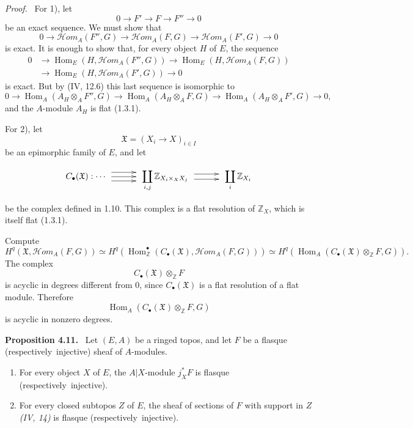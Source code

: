 \documentclass[11pt]{article}
\newcommand{\ZZ}{\mathbb Z}
\newcommand{\Hom}{\operatorname{Hom}}
\newcommand{\resp}{respectively}
\newcommand{\Hhom}{\mathcal{H}om}
\newenvironment{statement}[1]{\par\medskip\noindent\textbf{#1.}\ }{\par\medskip}
\newenvironment{prooftext}{\par\noindent\emph{Proof.}\ }{\par\medskip}
\begin{document}
\begin{prooftext}
For 1), let
\[
0\longrightarrow F'\longrightarrow F\longrightarrow F''\longrightarrow0
\]
be an exact sequence. We must show that
\[
0\longrightarrow \Hhom_A(F'',G)\longrightarrow \Hhom_A(F,G)
\longrightarrow \Hhom_A(F',G)\longrightarrow0
\]
is exact. It is enough to show that, for every object $H$ of $E$, the sequence
\begin{align*}
0&\longrightarrow \Hom_E(H,\Hhom_A(F'',G))
\longrightarrow \Hom_E(H,\Hhom_A(F,G))\\
&\longrightarrow \Hom_E(H,\Hhom_A(F',G))\longrightarrow0
\end{align*}
is exact. But by (IV, 12.6) this last sequence is isomorphic to
\[
0\to \Hom_A(A_H\otimes_A F'',G)
\to \Hom_A(A_H\otimes_A F,G)
\to \Hom_A(A_H\otimes_A F',G)\to0,
\]
and the $A$-module $A_H$ is flat (1.3.1).

For 2), let
\[
\mathfrak X=(X_i\to X)_{i\in I}
\]
be an epimorphic family of $E$, and let
\[
\xymatrix@M=.25cm@C=1cm{
C_\bullet(\mathfrak X):\cdots \ar@<5pt>[r]\ar[r]\ar@<-5pt>[r]&
\displaystyle\coprod_{i,j}\ZZ_{X_i\times_X X_j}
\ar@<3pt>[r]\ar@<-3pt>[r]&
\displaystyle\coprod_i\ZZ_{X_i}
}
\]
be the complex defined in 1.10. This complex is a flat resolution of $\ZZ_X$, which is itself flat (1.3.1).

Compute
\[
H^q(\mathfrak X,\Hhom_A(F,G))
\simeq
H^q\!\left(\Hom^\bullet_{\ZZ}(C_\bullet(\mathfrak X),\Hhom_A(F,G))\right)
\simeq
H^q\!\left(\Hom_A(C_\bullet(\mathfrak X)\otimes_{\ZZ}F,G)\right).
\]
The complex
\[
C_\bullet(\mathfrak X)\otimes_{\ZZ}F
\]
is acyclic in degrees different from $0$, since $C_\bullet(\mathfrak X)$ is a flat resolution of a flat module. Therefore
\[
\Hom_A(C_\bullet(\mathfrak X)\otimes_{\ZZ}F,G)
\]
is acyclic in nonzero degrees.
\end{prooftext}

\begin{statement}{Proposition 4.11}
Let $(E,A)$ be a ringed topos, and let $F$ be a flasque (\resp\ injective) sheaf of $A$-modules.
\begin{enumerate}[label=\arabic*)]
\item For every object $X$ of $E$, the $A|X$-module $j_X^*F$ is flasque (\resp\ injective).
\item For every closed subtopos $Z$ of $E$, the sheaf of sections of $F$ with support in $Z$ \emph{(IV, 14)} is flasque (\resp\ injective).
\end{enumerate}
\end{statement}
\end{document}
